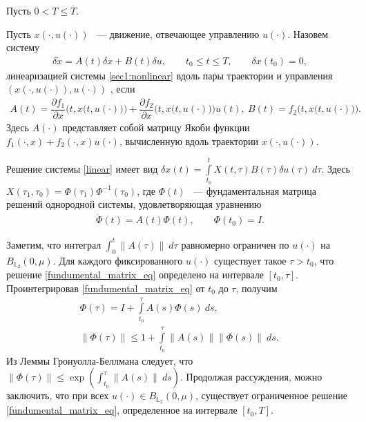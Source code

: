 \documentclass[../main.tex]{subfiles}
\begin{document}
	Пусть $ 0 <  T \leqslant \overline{T} $.
	\begin{definition}\label{def:linearized_system}
		Пусть $ x(\cdot,u(\cdot)) $ ~--- движение, отвечающее управлению $ u(\cdot)$. Назовем систему
		\begin{gather}\label{linear}
			\delta \dot{x} =  A(t) \delta x + B(t) \delta u, \qquad t_0 \leqslant t \leqslant T, \qquad \delta x(t_0) = 0,
		\end{gather}
		{\textit линеаризацией} системы \eqref{sec1:nonlinear} вдоль пары траектории и управления $\left( x(\cdot,u(\cdot)),u(\cdot)\right)   $ , если 
		\begin{gather*}
		    A(t) = \dfrac{\partial f_1}{\partial x} \Big(t,x\big(t,u(\cdot)\big)\Big) + \dfrac{\partial f_2}{\partial x}\Big(t,x\big(t,u(\cdot)\big)\Big) u(t), \  
		    B(t) = f_2 \Big(t,x\big(t,u(\cdot)\big)\Big).
		\end{gather*} Здесь $ A(\cdot) $ представляет собой матрицу Якоби функции $ f_1(\cdot, x) + f_2(\cdot, x) u(\cdot) $, вычисленную вдоль траектории $ x(\cdot,u(\cdot)) $.
	\end{definition}
	Решение системы \eqref{linear} имеет вид $\delta x(t) =  \int\limits_{t_0}^{t} X(t, \tau) B(\tau) \delta u(\tau) \ d\tau $. Здесь $ X(\tau_1,\tau_0)= \Phi(\tau_1) \Phi^{-1}(\tau_0) $, где $\Phi(t) $ ~--- фундаментальная матрица решений однородной системы, удовлетворяющая уравнению 
	\begin{gather}\label{fundumental_matrix_eq}
		\dot{\Phi}(t) = A(t) \Phi(t), \qquad \Phi(t_0) = I.
	\end{gather}
	
	Заметим, что интеграл $\int_0^t \| A(\tau)\|  \ d\tau$ равномерно ограничен по $u(\cdot) $ на $  B_{\mathbb{L}_2}(0,\mu)$. Для каждого фиксированного  $u(\cdot) $ существует такое $\tau > t_0$, что решение \eqref{fundumental_matrix_eq} определено на интервале $ [t_0, \tau] $.  Проинтегрировав \eqref{fundumental_matrix_eq} от $t_0$ до $\tau$, получим
	\begin{gather*}
		\Phi(\tau) = I + \int\limits_{t_0}^{\tau} A(s)  \Phi(s) \ ds, \\
		\|	\Phi(\tau) \| \leqslant 1 +  \int\limits_{t_0}^{\tau} \| A(s)\| \|\Phi(s)\| \ ds,
	\end{gather*}
	Из Леммы Гронуолла-Беллмана \cite{Bellman} следует, что  $	\|	\Phi(\tau) \| \leqslant \exp \left( \int_{t_0}^{\tau}  \| A(s)\| \ ds \right)$. Продолжая рассуждения, можно заключить,  что при всех $u(\cdot) \in  B_{\mathbb{L}_2}(0,\mu)$, существует ограниченное решение  \eqref{fundumental_matrix_eq}, определенное на интервале $[t_0, T]$.
	
\end{document}
